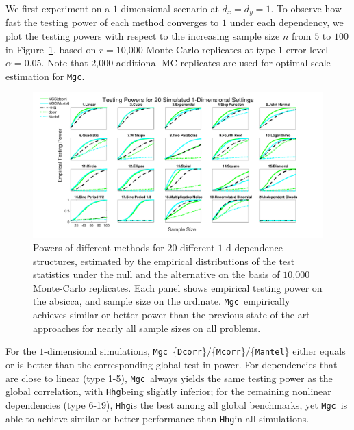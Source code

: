 \documentclass[11pt]{article}
\providecommand{\sct}[1]{{\sc \texttt{#1}}}
\newcommand{\Mgc}{\sct{Mgc}}
\newcommand{\Hhg}{\sct{Hhg}}
\newcommand{\Dcorr}{\sct{Dcorr}}
\newcommand{\Mcorr}{\sct{Mcorr}}
\newcommand{\Mantel}{\sct{Mantel}}
\begin{document}
We first experiment on a $1$-dimensional scenario at $d_{x}=d_{y}=1$. To observe how fast the testing power of each method converges to $1$ under each dependency, we plot the testing powers with respect to the increasing sample size $n$ from $5$ to $100$ in Figure~\ref{fig:1D}, based on $r=10$,$000$ Monte-Carlo replicates at type $1$ error level $\alpha=0.05$. Note that $2$,$000$ additional MC replicates are used for optimal scale estimation for \Mgc. %

\begin{figure}[htbp]
\includegraphics[width=1.0\textwidth]{Figures/Fig1DPower}
\caption{
Powers of different methods for $20$ different $1$-d dependence structures, estimated by the empirical distributions of the test statistics under the null and the alternative on the basis of $10$,$000$ Monte-Carlo replicates.
Each panel shows empirical testing power on the absicca, and sample size on the ordinate.
\Mgc~empirically achieves similar or better power than the previous state of the art approaches for nearly all sample sizes on all problems.}
\label{fig:1D}
\end{figure}

For the $1$-dimensional simulations, \Mgc~\{\Dcorr\}/\{\Mcorr\}/\{\Mantel\} either equals or is better than the corresponding global test in power. For dependencies that are close to linear (type 1-5), \Mgc~always yields the same testing power as the global correlation, with \Hhg being slightly inferior; for the remaining nonlinear dependencies (type 6-19), \Hhg is the best among all global benchmarks, yet \Mgc~is able to achieve similar or better performance than \Hhg in  all simulations. %
\end{document}
